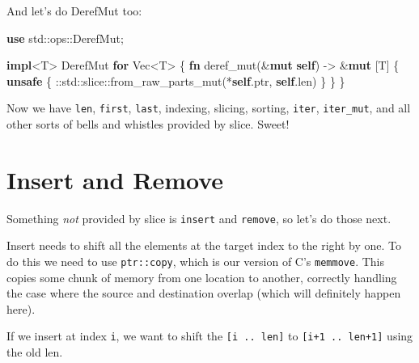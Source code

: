 \documentclass[a4paper,]{book}
\newenvironment{Shaded}{\begin{snugshade}}{\end{snugshade}}
\newcommand{\KeywordTok}[1]{\textcolor[rgb]{0.13,0.29,0.53}{\textbf{{#1}}}}
\newcommand{\DataTypeTok}[1]{\textcolor[rgb]{0.13,0.29,0.53}{{#1}}}
\newcommand{\NormalTok}[1]{{#1}}
\begin{document}
And let's do DerefMut too:

\begin{Shaded}
\begin{Highlighting}[]
\KeywordTok{use} \NormalTok{std::ops::DerefMut;}

\KeywordTok{impl}\NormalTok{<T> DerefMut }\KeywordTok{for} \DataTypeTok{Vec}\NormalTok{<T> \{}
    \KeywordTok{fn} \NormalTok{deref_mut(&}\KeywordTok{mut} \KeywordTok{self}\NormalTok{) -> &}\KeywordTok{mut} \NormalTok{[T] \{}
        \KeywordTok{unsafe} \NormalTok{\{}
            \NormalTok{::std::slice::from_raw_parts_mut(*}\KeywordTok{self}\NormalTok{.ptr, }\KeywordTok{self}\NormalTok{.len)}
        \NormalTok{\}}
    \NormalTok{\}}
\NormalTok{\}}
\end{Highlighting}
\end{Shaded}

Now we have \texttt{len}, \texttt{first}, \texttt{last}, indexing,
slicing, sorting, \texttt{iter}, \texttt{iter\_mut}, and all other sorts
of bells and whistles provided by slice. Sweet!

\section{Insert and Remove}\label{sec--vec-insert-remove}

Something \emph{not} provided by slice is \texttt{insert} and
\texttt{remove}, so let's do those next.

Insert needs to shift all the elements at the target index to the right
by one. To do this we need to use \texttt{ptr::copy}, which is our
version of C's \texttt{memmove}. This copies some chunk of memory from
one location to another, correctly handling the case where the source
and destination overlap (which will definitely happen here).

If we insert at index \texttt{i}, we want to shift the
\texttt{{[}i\ ..\ len{]}} to \texttt{{[}i+1\ ..\ len+1{]}} using the old
len.
\end{document}
